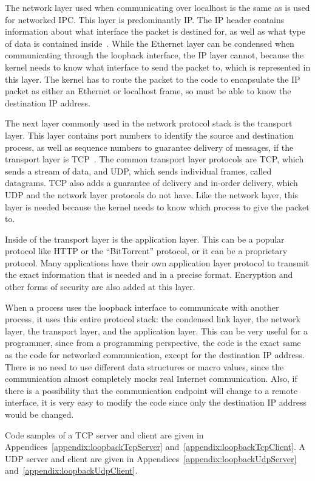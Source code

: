 The network layer used when communicating over localhost is the same as is used for networked IPC.  This layer is predominantly IP.  The IP header contains information about what interface the packet is destined for, as well as what type of data is contained inside~\cite{RFC0791}.  While the Ethernet layer can be condensed when communicating through the loopback interface, the IP layer cannot, because the kernel needs to know what interface to send the packet to, which is represented in this layer.  The kernel has to route the packet to the code to encapsulate the IP packet as either an Ethernet or localhost frame, so must be able to know the destination IP address.

The next layer commonly used in the network protocol stack is the transport layer.  This layer contains port numbers to identify the source and destination process, as well as sequence numbers to guarantee delivery of messages, if the transport layer is TCP~\cite{RFC0793}.  The common transport layer protocols are TCP, which sends a stream of data, and UDP, which sends individual frames, called datagrams.  TCP also adds a guarantee of delivery and in-order delivery, which UDP and the network layer protocols do not have.  Like the network layer, this layer is needed because the kernel needs to know which process to give the packet to.

Inside of the transport layer is the application layer.  This can be a popular protocol like HTTP or the ``BitTorrent'' protocol, or it can be a proprietary protocol.  Many applications have their own application layer protocol to transmit the exact information that is needed and in a precise format.  Encryption and other forms of security are also added at this layer.

When a process uses the loopback interface to communicate with another process, it uses this entire protocol stack: the condensed link layer, the network layer, the transport layer, and the application layer.  This can be very useful for a programmer, since from a programming perspective, the code is the exact same as the code for networked communication, except for the destination IP address.  There is no need to use different data structures or macro values, since the communication almost completely mocks real Internet communication.  Also, if there is a possibility that the communication endpoint will change to a remote interface, it is very easy to modify the code since only the destination IP address would be changed.

Code samples of a TCP server and client are given in Appendices~\ref{appendix:loopbackTcpServer} and~\ref{appendix:loopbackTcpClient}.  A UDP server and client are given in Appendices~\ref{appendix:loopbackUdpServer} and~\ref{appendix:loopbackUdpClient}.

